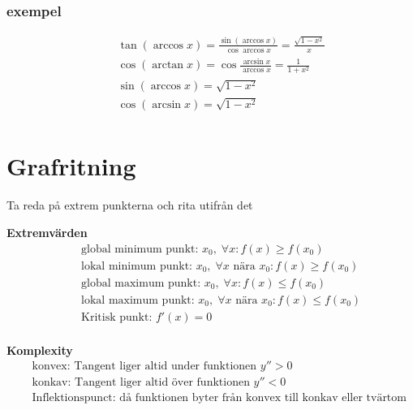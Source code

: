 \subsubsection{exempel}
\begin{align*}
  &\quad  \tan{(\arccos{x})} = \frac{\sin{(\arccos{x})}}{\cos{\arccos{x}}}= \frac{\sqrt{1-x^2}}{x} \\
  &\quad  \cos{(\arctan{x})} = \cos{\frac{\arcsin{x}}{\arccos{x}}}= \frac{1}{1+x^2} \\ %
  &\quad  \sin{(\arccos{x})} = \sqrt{1-x^2} \\
  &\quad  \cos{(\arcsin{x})} = \sqrt{1-x^2} \\
\end{align*}



\section{Grafritning}
Ta reda på extrem punkterna och rita utifrån det

\textbf{Extremvärden}
\begin{align*}
  &\quad  \text{global minimum punkt: } x_0, \; \forall x: f(x) \geq f(x_0) \\
  &\quad  \text{lokal minimum punkt: } x_0, \; \forall x \text{ nära } x_0: f(x) \geq f(x_0) \\
  &\quad  \text{global maximum punkt: } x_0, \; \forall x: f(x) \leq f(x_0) \\
  &\quad  \text{lokal maximum punkt: } x_0, \; \forall x \text{ nära } x_0: f(x) \leq f(x_0) \\
  &\quad  \text{Kritisk punkt: } f'(x)=0 \\
\end{align*}


\textbf{Komplexity}
\begin{align*}
  &\quad  \text{konvex: Tangent liger altid under funktionen } y''>0 \\
  &\quad  \text{konkav: Tangent liger altid över funktionen } y''<0 \\
  &\quad  \text{Inflektionspunct: då funktionen byter från konvex till konkav eller tvärtom }  \\
\end{align*}


